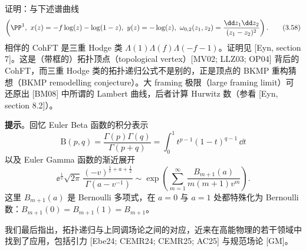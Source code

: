 \begin{exercise}[3.5]
证明：与下述谱曲线
\begin{equation}
  \left(\PP^1,\ x(z)=-f\log(z)-\log(1-z),\ y(z)=-\log(z),\ \omega_{0,2}(z_1,z_2)=\frac{\dd z_1\dd z_2}{(z_1-z_2)^2}\right).
  \tag{3.58}
\end{equation}
相伴的 CohFT 是三重 Hodge 类 $\Lambda(1)\Lambda(f)\Lambda(-f-1)$。证明见 [Eyn, section 7]。这是（带框的）拓扑顶点（topological vertex）[MV02; LLZ03; OP04] 背后的 CohFT，而三重 Hodge 类的拓扑递归公式不是别的，正是顶点的 BKMP 重构猜想（BKMP remodelling conjecture）。大 framing 极限（large framing limit）可还原出 [BM08] 中所谓的 Lambert 曲线，后者计算 Hurwitz 数（参看 [Eyn, section 8.2]）。

\smallskip
\noindent\textbf{提示}。回忆 Euler Beta 函数的积分表示
\begin{equation}
  \mathrm{B}(p,q)=\frac{\Gamma(p)\Gamma(q)}{\Gamma(p+q)}=\int_{0}^{1}t^{p-1}(1-t)^{q-1}\,\dd t
  \tag{3.59}
\end{equation}
以及 Euler Gamma 函数的渐近展开
\begin{equation}
  \ee^{\frac{1}{v}}\sqrt{2\pi}\,\frac{(-v)^{\frac{1}{v}+a+\frac{1}{2}}}{\Gamma(a-v^{-1})}\sim\exp\left(\sum_{m=1}^{\infty}\frac{B_{m+1}(a)}{m(m+1)v^m}\right).
  \tag{3.60}
\end{equation}
这里 $B_{m+1}(a)$ 是 Bernoulli 多项式，在 $a=0$ 与 $a=1$ 处都特殊化为 Bernoulli 数：$B_{m+1}(0)=B_{m+1}(1)=B_{m+1}$。
\end{exercise}






我们最后指出，拓扑递归与上同调场论之间的对应，近来在高能物理的若干领域中找到了应用，包括引力 [Ebe24; CEMR24; CEMR25; AC25] 与规范场论 [GM]。
